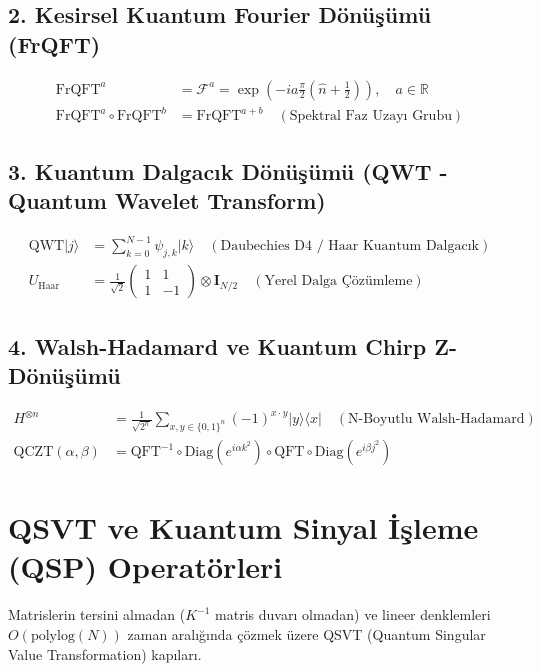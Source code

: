 \documentclass[11pt, a4paper]{article}
\begin{document}
\subsection{2. Kesirsel Kuantum Fourier Dönüşümü (FrQFT)}
\begin{align}
\text{FrQFT}^a &= \mathcal{F}^a = \exp\left( -i a \frac{\pi}{2} \left( \hat{n} + \frac{1}{2} \right) \right), \quad a \in \mathbb{R} \\
\text{FrQFT}^a \circ \text{FrQFT}^b &= \text{FrQFT}^{a+b} \quad (\text{Spektral Faz Uzayı Grubu})
\end{align}

\subsection{3. Kuantum Dalgacık Dönüşümü (QWT - Quantum Wavelet Transform)}
\begin{align}
\text{QWT} |j\rangle &= \sum_{k=0}^{N-1} \psi_{j,k} |k\rangle \quad (\text{Daubechies D4 / Haar Kuantum Dalgacık}) \\
U_{\text{Haar}} &= \frac{1}{\sqrt{2}} \begin{pmatrix} 1 & 1 \\ 1 & -1 \end{pmatrix} \otimes \mathbf{I}_{N/2} \quad (\text{Yerel Dalga Çözümleme})
\end{align}

\subsection{4. Walsh-Hadamard ve Kuantum Chirp Z-Dönüşümü}
\begin{align}
H^{\otimes n} &= \frac{1}{\sqrt{2^n}} \sum_{x, y \in \{0,1\}^n} (-1)^{x \cdot y} |y\rangle \langle x| \quad (\text{N-Boyutlu Walsh-Hadamard}) \\
\text{QCZT}(\alpha, \beta) &= \text{QFT}^{-1} \circ \text{Diag}(e^{i \alpha k^2}) \circ \text{QFT} \circ \text{Diag}(e^{i \beta j^2})
\end{align}

\section{QSVT ve Kuantum Sinyal İşleme (QSP) Operatörleri}

Matrislerin tersini almadan ($K^{-1}$ matris duvarı olmadan) ve lineer denklemleri $O(\text{polylog}(N))$ zaman aralığında çözmek üzere QSVT (Quantum Singular Value Transformation) kapıları.
\end{document}
